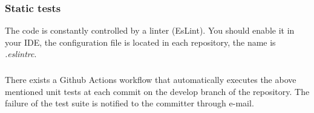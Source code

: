 \subsubsection{Static tests}
The code is constantly controlled by a linter (EsLint). You should enable it in your IDE, the configuration file is
located in each repository, the name is \textit{.eslintrc}.

\subsubsection{}
There exists a Github Actions workflow that automatically executes the above mentioned unit tests at each commit on the develop branch of the repository. The failure of the test suite is notified to the committer through e-mail.